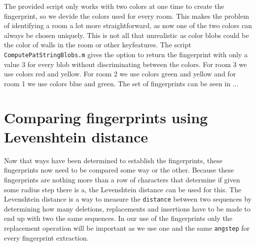 \documentclass[a4paper, 20pt]{article}
\begin{document}
\begin{figure}[!ht]
\centering
\begin{floatrow}
  
\end{floatrow}
\end{figure}

The provided script only works with two colors at one time to create the
fingerprint, so we devide the colors used for every room. This makes the problem
of identifying a room
a lot more straightforward, as now one of the two colors can always be chosen
uniquely. This is not all that unrealistic as color blobs could be the color of
walls in the room or other keyfeatures. The script \texttt{ComputePatStringBlobs.m} gives the option to return
the fingerprint with only a value 3 for every blob without discriminating
between
the colors.
For room 3 we use colors red and yellow. For room 2 we use colors green and
yellow and for room 1 we use colors blue and green. The set of fingerprints can
be seen in ...


\section{Comparing fingerprints using Levenshtein distance}
Now that ways have been determined to establish the fingerprints, these
fingerprints now need to be compared some way or the other. Because these
fingerprints are nothing more than a row of characters that determine if
given some radius step there is a, the Levenshtein distance can be used for
this. The Levenshtein distance is a way to measure the \texttt{distance}
between two sequences by determining how many deletions, replacements and
insertions have to be made to end up with two the same sequences. In our use of
the fingerprints only the replacement operation will be important as we use one
and the same \texttt{angstep} for every fingerprint extraction.
\end{document}
